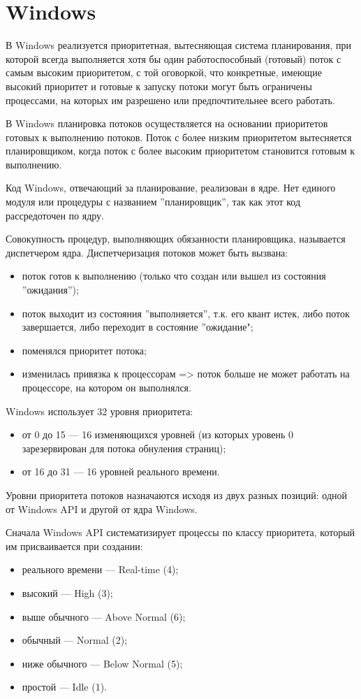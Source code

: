 \documentclass[a4paper,14pt,russian]{extreport}
\begin{document}
	\section{Windows}
	В Windows реализуется приоритетная, вытесняющая система планирования, при которой всегда выполняется хотя бы один работоспособный (готовый) поток с самым высоким приоритетом, с той оговоркой, что конкретные, имеющие высокий приоритет и готовые к запуску потоки могут быть ограничены процессами, на которых им разрешено или предпочтительнее всего работать.
	
	В Windows планировка потоков осуществляется на основании приоритетов готовых к выполнению потоков.
	Поток с более низким приоритетом вытесняется планировщиком, когда поток с более высоким приоритетом	становится готовым к выполнению.
	
	Код Windows, отвечающий за планирование, реализован в ядре.
	Нет единого модуля или процедуры с названием ”планировщик”, так как этот код рассредоточен по ядру. 
	
	Совокупность процедур, выполняющих обязанности планировщика, называется диспетчером ядра.
	Диспетчеризация потоков может быть вызвана:
	\begin{itemize}
		\item поток готов к выполнению (только что создан или вышел из состояния ”ожидания”);
		\item поток выходит из состояния ”выполняется”, т.к. его квант истек, либо поток завершается, либо переходит в состояние ”ожидание";
		\item поменялся приоритет потока;
		\item изменилась привязка к процессорам => поток больше не может работать на процессоре, на котором он выполнялся.
	\end{itemize}
	
	Windows использует 32 уровня приоритета:
	\begin{itemize}
		\item от 0 до 15 –-- 16 изменяющихся уровней (из которых уровень 0 зарезервирован для потока обнуления страниц);
		\item от 16 до 31 –-- 16 уровней реального времени.
	\end{itemize}
	
	Уровни приоритета потоков назначаются исходя из двух разных позиций:
	одной от Windows API и другой от ядра Windows.
	
	Сначала Windows API систематизирует процессы по классу приоритета, который им присваивается при создании:
	\begin{itemize}
		\item реального времени — Real-time (4);
		\item высокий — High (3);
		\item выше обычного — Above Normal (6);
		\item обычный — Normal (2);
		\item ниже обычного — Below Normal (5);
		\item простой — Idle (1).
	\end{itemize}
\end{document}

